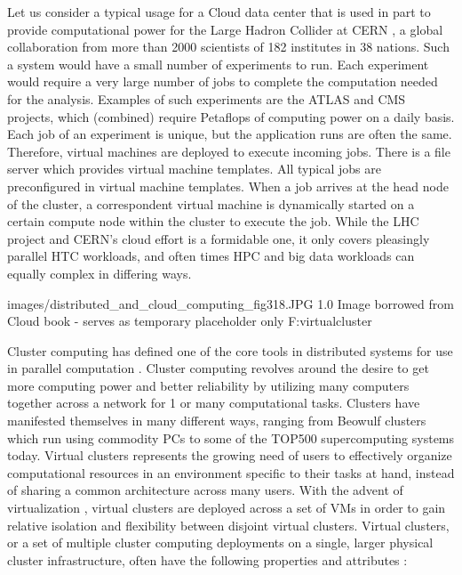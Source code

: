 Let us consider a typical usage for a Cloud data center that is used in part to provide computational power for the Large Hadron Collider at CERN \cite{CERN2003}, a global collaboration from more than 2000 scientists of 182 institutes in 38 nations.  Such a system would have a small number of experiments to run. Each experiment would require a very large number of jobs to complete the computation needed for the analysis.  Examples of such experiments are the ATLAS \cite{luo2005gsp} and CMS \cite{cms} projects, which (combined) require Petaflops of computing power on a daily basis.  Each job of an experiment is unique, but the application runs are often the same.  Therefore, virtual machines are deployed to execute incoming jobs. There is a file server which provides virtual machine templates. All typical jobs are preconfigured in virtual machine templates. When a job arrives at the head node of the  cluster, a correspondent virtual machine is dynamically started on a certain compute node within the cluster to execute the job.  While the LHC project and CERN's cloud effort is a formidable one, it only covers pleasingly parallel HTC workloads, and often times HPC and big data workloads can equally complex in differing ways.


  {images/distributed_and_cloud_computing_fig318.JPG}
  {1.0}
  {Image borrowed from Cloud book - serves as temporary placeholder only}
  {F:virtualcluster}


Cluster computing has defined one of the core tools in distributed systems for use in parallel computation \cite{amdahl1967validity}. Cluster computing revolves around the desire to get more computing power and better reliability by utilizing many computers together across a network for 1 or many computational tasks. Clusters have manifested themselves in many different ways, ranging from Beowulf clusters \cite{becker1995beowulf} which run using commodity PCs to some of the TOP500 \cite{www-top500} supercomputing systems today.  Virtual clusters represents the growing need of users to effectively organize computational resources in an environment specific to their tasks at hand, instead of sharing a common architecture across many users. With the advent of virtualization \cite{barham2003xen}, virtual clusters are deployed across a set of VMs in order to gain relative isolation and flexibility between disjoint virtual clusters. Virtual clusters, or a set of multiple cluster computing deployments on a single, larger physical cluster infrastructure, often have the following properties and attributes \cite{hwang2013distributed}:

